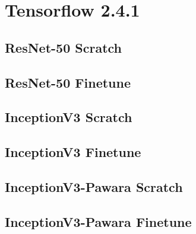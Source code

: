 \section{Tensorflow 2.4.1}

\subsection{ResNet-50 Scratch}
\begin{figure}[H]

\end{figure}

\subsection{ResNet-50 Finetune}
\begin{figure}[H]

\end{figure}



\subsection{InceptionV3 Scratch}
\begin{figure}[H]

\end{figure}
\subsection{InceptionV3 Finetune}
\begin{figure}[H]

\end{figure}



\subsection{InceptionV3-Pawara Scratch}
\begin{figure}[H]

\end{figure}

\subsection{InceptionV3-Pawara Finetune}
\begin{figure}[H]

\end{figure}






